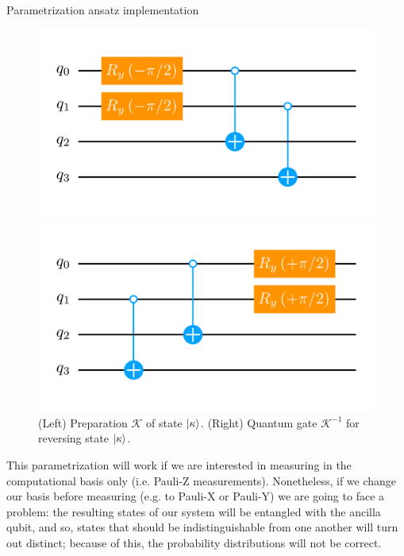 \documentclass[9pt, handout, aspectratio=169]{beamer}	%
\begin{document}
\begin{frame}[allowframebreaks]{Parametrization ansatz implementation}
	\begin{figure}[!p]
		\centering
		\begin{minipage}[c]{.45\linewidth}
			\centering
			\includegraphics[width=\linewidth]{Figures/NJL1-model-solving/ansatz-implementation-base-state-preparation-kappa}
		\end{minipage}
	  \hspace{.025\linewidth}
		\begin{minipage}[c]{.45\linewidth}
			\centering
			\includegraphics[width=\linewidth]{Figures/NJL1-model-solving/ansatz-implementation-base-state-reversing-kappa}
		\end{minipage}
		\caption{(Left) Preparation $\mathcal{K}$ of state $\ket{\kappa}$. (Right) Quantum gate $\mathcal{K}^{-1}$ for reversing state $\ket{\kappa}$.}
	\end{figure}

\break

	\begin{multicols}{2}

		This parametrization will work if we are interested in measuring in the computational basis only (i.e. Pauli-Z measurements). Nonetheless, if we change our basis before measuring (e.g. to Pauli-X or Pauli-Y) we are going to face a problem: the resulting states of our system will be entangled with the ancilla qubit, and so, states that should be indistinguishable from one another will turn out distinct; because of this, the probability distributions will not be correct.


\end{multicols}
\end{frame}
\end{document}
